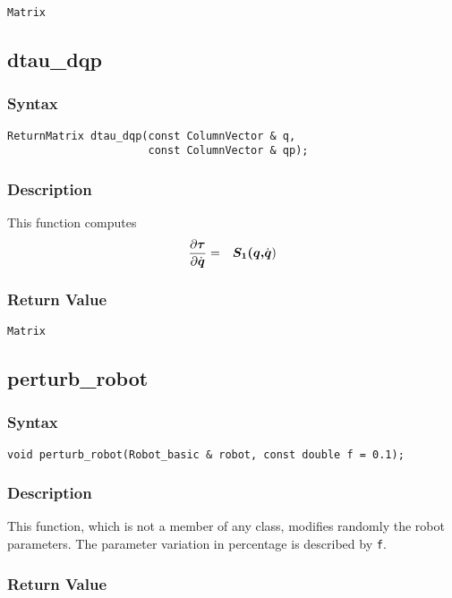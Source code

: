 \documentclass[11pt,fleqn,letterpaper]{report}
\newcommand{\mbold}[1]{\mbox{\boldmath $ #1 $}}
\newcommand{\dfdx}[2]{\frac{\partial #1}{\partial #2}}
\begin{document}
{\tt Matrix}

\newpage

\subsection*{dtau\_dqp}
\subsubsection*{Syntax}
\begin{verbatim}
ReturnMatrix dtau_dqp(const ColumnVector & q, 
                      const ColumnVector & qp);
\end{verbatim}
\subsubsection*{Description}
This function computes 
\begin{eqnarray}
\dfdx{\mbold{\tau}}{\dot{\mbold{q}}} & = & \mbold{S_1(q,}\dot{\mbold{q}}) 
\end{eqnarray}


\subsubsection*{Return Value}

{\tt Matrix}

\newpage

\subsection*{perturb\_robot}
\subsubsection*{Syntax}
\begin{verbatim}
void perturb_robot(Robot_basic & robot, const double f = 0.1);
\end{verbatim}
\subsubsection*{Description}
This function, which is not a member of any class, modifies randomly
the robot parameters. The parameter variation in percentage is
described by \texttt{f}.

\subsubsection*{Return Value}
\end{document}
